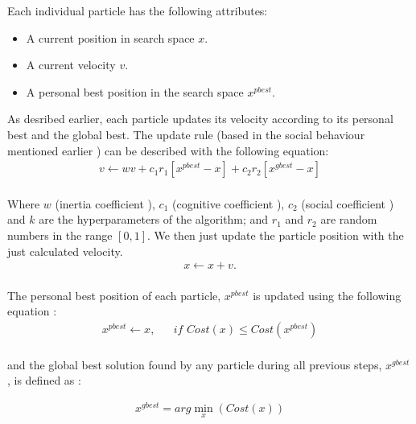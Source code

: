 \documentclass[journal,onecolumn]{IEEEtran}
\begin{document}
Each individual particle has the following attributes: 
\\
\begin{itemize}
    \item A current position in search space $x$.
    \item A current velocity $v$.
    \item A personal best position in the search space $x^{pbest}$.\\
\end{itemize}
As desribed earlier, each particle updates its velocity according to its personal best and the global best. The update rule (based in the social behaviour mentioned earlier ) can be described with the following equation:
\\
\begin{equation} \label{eq:1}
    \begin{aligned}
    v \leftarrow w v + c_{1} r_{1} [x^{pbest} - x] + c_{2} r_{2} [x^{gbest} - x]
    \end{aligned}
\end{equation}
\\
Where $w$ (inertia coefficient ), $c_{1}$ (cognitive coefficient ), $c_{2}$ (social coefficient ) and $k$ are the hyperparameters of the algorithm; and $r_{1}$ and $r_{2}$ are random numbers in the range $[0, 1]$. We then just update the particle position with the just calculated velocity.
\\
\begin{equation} \label{eq:2}
    \begin{aligned}
        x \leftarrow x + v.
    \end{aligned}
\end{equation}
\\
The personal best position of each particle, $x^{pbest}$ is updated using the following equation :
\\
\begin{equation} \label{eq:3}
  \begin{aligned}
    x^{pbest} \leftarrow x, &&\textit{if } Cost(x)\leq Cost(x^{pbest})
  \end{aligned}
\end{equation}
\\
and the global best solution found by any particle during all previous steps, $x^{gbest}$, is defined as :

\begin{equation} \label{eq:4}
    \begin{aligned}
        x^{gbest}=arg\min_{x}( Cost(x) )
    \end{aligned}
\end{equation}
\end{document}
